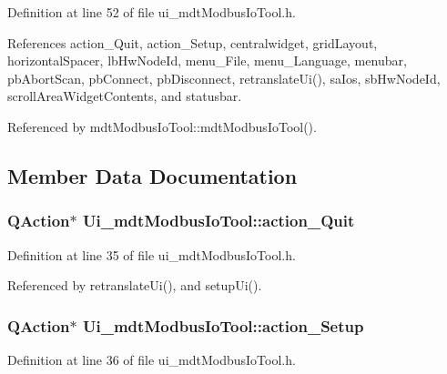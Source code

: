 Definition at line 52 of file ui\-\_\-mdt\-Modbus\-Io\-Tool.\-h.



References action\-\_\-\-Quit, action\-\_\-\-Setup, centralwidget, grid\-Layout, horizontal\-Spacer, lb\-Hw\-Node\-Id, menu\-\_\-\-File, menu\-\_\-\-Language, menubar, pb\-Abort\-Scan, pb\-Connect, pb\-Disconnect, retranslate\-Ui(), sa\-Ios, sb\-Hw\-Node\-Id, scroll\-Area\-Widget\-Contents, and statusbar.



Referenced by mdt\-Modbus\-Io\-Tool\-::mdt\-Modbus\-Io\-Tool().



\subsection{Member Data Documentation}
\hypertarget{class_ui__mdt_modbus_io_tool_a1a8b372c8e609cd2a0b59298002ab3db}{
\subsubsection[{action\-\_\-\-Quit}]{\setlength{\rightskip}{0pt plus 5cm}Q\-Action$\ast$ Ui\-\_\-mdt\-Modbus\-Io\-Tool\-::action\-\_\-\-Quit}}\label{class_ui__mdt_modbus_io_tool_a1a8b372c8e609cd2a0b59298002ab3db}


Definition at line 35 of file ui\-\_\-mdt\-Modbus\-Io\-Tool.\-h.



Referenced by retranslate\-Ui(), and setup\-Ui().

\hypertarget{class_ui__mdt_modbus_io_tool_a1e0b957f5e299ea57754889bf0a670ca}{
\subsubsection[{action\-\_\-\-Setup}]{\setlength{\rightskip}{0pt plus 5cm}Q\-Action$\ast$ Ui\-\_\-mdt\-Modbus\-Io\-Tool\-::action\-\_\-\-Setup}}\label{class_ui__mdt_modbus_io_tool_a1e0b957f5e299ea57754889bf0a670ca}


Definition at line 36 of file ui\-\_\-mdt\-Modbus\-Io\-Tool.\-h.




